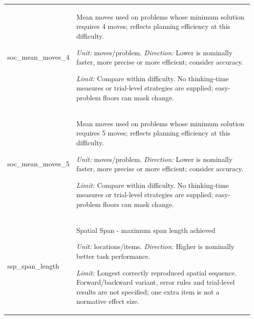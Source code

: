 \begin{longtable}{p{.26\linewidth}p{.66\linewidth}}
{\ttfamily\footnotesize soc\_\allowbreak{}mean\_\allowbreak{}moves\_\allowbreak{}4} & Mean moves used on problems whose minimum solution requires 4 moves; reflects planning efficiency at this difficulty.\par\textit{Unit:} moves/problem. \textit{Direction:} Lower is nominally faster, more precise or more efficient; consider accuracy.\par\textit{Limit:} Compare within difficulty. No thinking-time measures or trial-level strategies are supplied; easy-problem floors can mask change. \\[7pt]
{\ttfamily\footnotesize soc\_\allowbreak{}mean\_\allowbreak{}moves\_\allowbreak{}5} & Mean moves used on problems whose minimum solution requires 5 moves; reflects planning efficiency at this difficulty.\par\textit{Unit:} moves/problem. \textit{Direction:} Lower is nominally faster, more precise or more efficient; consider accuracy.\par\textit{Limit:} Compare within difficulty. No thinking-time measures or trial-level strategies are supplied; easy-problem floors can mask change. \\[7pt]
{\ttfamily\footnotesize ssp\_\allowbreak{}span\_\allowbreak{}length} & Spatial Span - maximum span length achieved\par\textit{Unit:} locations/items. \textit{Direction:} Higher is nominally better task performance.\par\textit{Limit:} Longest correctly reproduced spatial sequence. Forward/backward variant, error rules and trial-level results are not specified; one extra item is not a normative effect size. \\[7pt]
\bottomrule\end{longtable}
